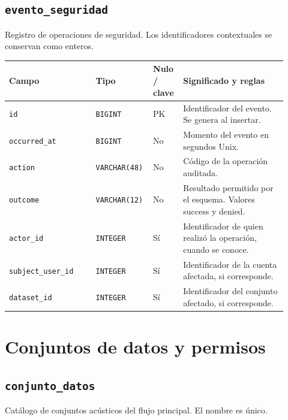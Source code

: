 \subsection*{\texttt{evento\_\allowbreak{}seguridad}}

Registro de operaciones de seguridad. Los identificadores contextuales se conservan como enteros.

\noindent
\begin{tabular}{@{}p{0.30\linewidth}p{0.16\linewidth}p{0.10\linewidth}p{0.36\linewidth}@{}}
\hline
\textbf{Campo} & \textbf{Tipo} & \textbf{Nulo / clave} & \textbf{Significado y reglas} \\
\hline
\texttt{id} & \texttt{BIGINT} & PK & Identificador del evento. Se genera al insertar. \\
\texttt{occurred\_\allowbreak{}at} & \texttt{BIGINT} & No & Momento del evento en segundos Unix. \\
\texttt{action} & \texttt{VARCHAR(48)} & No & Código de la operación auditada. \\
\texttt{outcome} & \texttt{VARCHAR(12)} & No & Resultado permitido por el esquema. Valores success y denied. \\
\texttt{actor\_\allowbreak{}id} & \texttt{INTEGER} & Sí & Identificador de quien realizó la operación, cuando se conoce. \\
\texttt{subject\_\allowbreak{}user\_\allowbreak{}id} & \texttt{INTEGER} & Sí & Identificador de la cuenta afectada, si corresponde. \\
\texttt{dataset\_\allowbreak{}id} & \texttt{INTEGER} & Sí & Identificador del conjunto afectado, si corresponde. \\
\hline
\end{tabular}

\section*{Conjuntos de datos y permisos}

\subsection*{\texttt{conjunto\_\allowbreak{}datos}}

Catálogo de conjuntos acústicos del flujo principal. El nombre es único.

